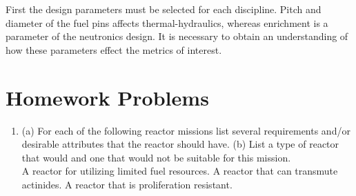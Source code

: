 \documentclass[]{article}
\begin{document}
First the design parameters must be selected for each discipline. Pitch and diameter of the fuel pins affects thermal-hydraulics, whereas enrichment is a parameter of the neutronics design. It is necessary to obtain an understanding of how these parameters effect the metrics of interest. 

\section{Homework Problems}
\begin{enumerate}
\item (a) For each of the following reactor missions list several requirements and/or desirable attributes that the reactor should have. (b) List a type of reactor that would and one that would not be suitable for this mission.\\
A reactor for utilizing limited fuel resources. A reactor that can transmute actinides. A reactor that is proliferation resistant. 

\end{enumerate}
\end{document}
